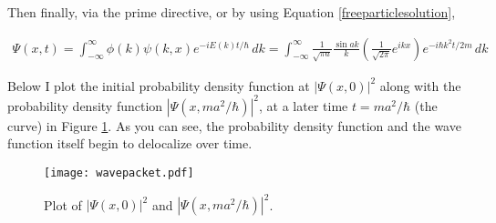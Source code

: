 Then finally, via the prime directive, or by using Equation
\ref{freeparticlesolution}, 

\begin{align} \label{solutionfree}
  \Psi(x, t) = \int_{-\infty}^{\infty} \phi(k)\psi(k, x) e^{-iE(k)t/\hbar} \,
  dk = \int_{-\infty}^{\infty} \frac{1}{\sqrt{\pi a}} \frac{\sin ak}{k} \left(
  \frac{1}{\sqrt{2\pi}} e^{ikx}\right)  e^{-i\hbar k^2 t / 2m} \, dk
\end{align} \vspace{3px}

Below I plot the initial probability density function at $|\Psi(x, 0)|^2$
along with the probability density function $|\Psi(x, ma^2 / \hbar)|^2$, at
a later time $t = ma^2 / \hbar$ (the curve) in Figure \ref{freegraph}. As you
can see, the probability density function and the wave function itself begin
to delocalize over time.

\begin{comment}
\begin{figure}[!ht]
  \centering
    \texttt{[image: wavepacket.pdf]}
    \caption{Plot of $|\Psi(x, 0)|^2$ and $|\Psi(x, ma^2 / \hbar)|^2$ for the
      wave function defined in Equation \ref{solutionfree} derived from the
      initial wave function in Equation \ref{problemfree}.}
\end{figure}
\end{comment}

\begin{figure}[H]
  \centering
    \texttt{[image: wavepacket.pdf]}
    \caption{Plot of $|\Psi(x, 0)|^2$ and $|\Psi(x, ma^2 / \hbar)|^2$.}
    \label{freegraph}
\end{figure}









